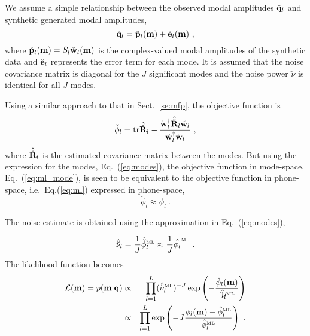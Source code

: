 \documentclass{saclantc}
\newcommand{\modespace}[1]{\breve{{#1}}}
\newcommand{\ML}[1]{\hat{#1}^{\mbox{\tiny\rm ML}}}
\begin{document}
We assume a simple  relationship between the observed modal amplitudes
$ \modespace{\bf q}_l$  and synthetic generated modal amplitudes, 
\begin{equation}
 \modespace{\bf q}_l = \modespace{\bf p}_l({\bf m}) + 
 \modespace{\bf e}_l({\bf m})~,
\end{equation}
where $\modespace{\bf p}_l({\bf m})=S_l \modespace{\bf w}_l({\bf m})$ is the
complex-valued modal amplitudes of
the synthetic data  and $ \modespace{\bf e}_l$ represents the error term for
each mode.
%
It is assumed that the noise covariance matrix is diagonal for the $J$ 
significant modes and the  noise power $\modespace{\nu}$ is identical 
for all $J$ modes.

Using a similar approach to that in Sect.~\ref{se:mfp}, the objective function is
\begin{equation}
  \modespace{\phi}_l = \mbox{tr} \hat{\modespace{\bf R}}_l - 
  \frac{{\modespace{\bf w}_l}^\dagger \hat{\modespace{\bf R}}_l
        \modespace{\bf w}_l}
       {{\modespace{\bf w}_l}^\dagger \modespace{\bf w}_l}~, 
  \label{eq:ml_mode}
\end{equation}
where $\hat{\modespace{\bf R}}_l$ is the estimated covariance matrix between
the modes. But  using the expression for the modes,
Eq.~(\ref{eq:modes}), the objective function in mode-space, 
Eq.~(\ref{eq:ml_mode}), is  seen to be equivalent to the objective
function in  phone-space, i.e.\,  Eq.(\ref{eq:ml})
expressed in phone-space, 
\begin{equation}
 \modespace{\phi}_l \approx \phi_l~. 
\end{equation}

The noise estimate is obtained using the approximation in Eq.~(\ref{eq:modes}),

\begin{equation}
   \hat{\modespace{\nu}}_l = 
       \frac{1}{J}{\ML{\modespace{\phi}}_l} \approx \frac{1}{J}\ML{\phi_l}~.
\end{equation}
The likelihood function becomes
\begin{eqnarray}
 {\cal L}({\bf m}) = p({\bf m} |{\bf q}) 
 &\propto &
  \prod_{l=1}^{L} (\ML{\modespace{\nu}}_l)^{-J} \exp 
       \left( -\frac{\modespace{\phi}_l({\bf m})}
                    {\ML{\modespace{\nu}_l}}\right) \nonumber \\
&\propto & 
  \prod_{l=1}^{L}
       \exp \left( -J\frac{\phi_l({\bf m})-\ML{\phi}_l}
        {\ML{\phi}_l}\right)~.
\label{eq:mlmfp_mode}
\end{eqnarray}
\end{document}
